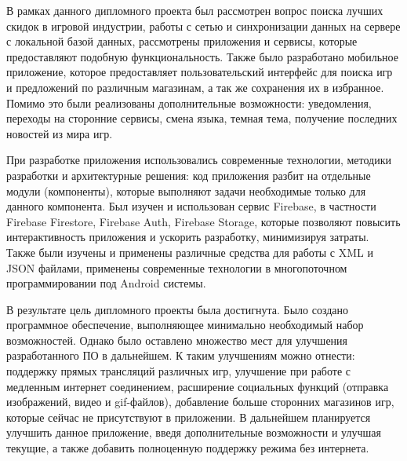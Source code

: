  
В рамках данного дипломного проекта был рассмотрен вопрос поиска лучших скидок в игровой индустрии, работы с сетью и синхронизации данных на сервере с локальной базой данных, рассмотрены приложения и сервисы, которые предоставляют подобную функциональность. Также было разработано мобильное приложение, которое предоставляет пользовательский интерфейс для поиска игр и предложений по различным магазинам, а так же сохранения их в избранное. Помимо это были реализованы дополнительные возможности: уведомления, переходы на сторонние сервисы, смена языка, темная тема, получение последних новостей из мира игр.
 
При разработке приложения использовались современные технологии, методики разработки и архитектурные решения: код приложения разбит на отдельные модули (компоненты), которые выполняют задачи необходимые только для данного компонента. Был изучен и использован сервис Firebase, в частности Firebase Firestore, Firebase Auth, Firebase Storage, которые позволяют повысить интерактивность приложения и ускорить разработку, минимизируя затраты. Также были изучены и применены различные средства для работы с XML и JSON файлами, применены современные технологии в многопоточном программировании под Android системы.
 
В результате цель дипломного проекты была достигнута.
Было создано программное обеспечение, выполняющее минимально необходимый набор возможностей.
Однако было оставлено множество мест для улучшения разработанного ПО в дальнейшем. К таким улучшениям можно отнести: поддержку прямых трансляций различных игр, улучшение при работе с медленным интернет соединением, расширение социальных функций (отправка изображений, видео и gif-файлов), добавление больше сторонних магазинов игр, которые сейчас не присутствуют в приложении. В дальнейшем планируется улучшить данное приложение, введя дополнительные возможности и улучшая текущие, а также добавить полноценную поддержку режима без интернета.
